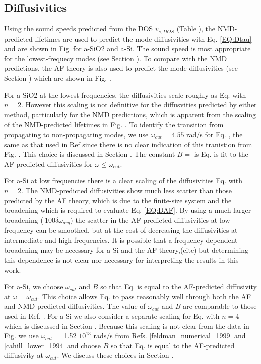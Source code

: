 \documentclass[aps,prb,twocolumn,superscriptaddress,footinbib,amsmath,amssymb,floatfix]{revtex4}
\begin{document}
\subsection{\label{S:Diffusivities}Diffusivities}

Using the sound speeds predicted 
from the DOS $v_{s,DOS}$ (Table ), the NMD-predicted lifetimes are 
used to predict the mode diffusivities with Eq. \eqref{EQ:Dtau} 
and are shown in Fig. for a-SiO2 and a-Si. 
The sound speed is most appropriate  
for the lowest-frequecy modes (see Section ). To compare with the 
NMD predictions, the AF theory is also used to predict the mode 
diffusivities (see Section ) which are shown in Fig. . 

For a-SiO2 at the lowest frequencies, the 
diffusivities scale roughly as Eq. with $n=2$.  However this 
scaling is not definitive for the diffusvities predicted by either 
method, particularly for the NMD predictions, which 
is apparent from the scaling of the NMD-predicted lifetimes 
in Fig. . To identify the transition from propagating 
to non-propagating modes, we use $\omega_{cut} = 4.55$ rad$/$s 
for Eq. , 
the same as that used in Ref  since 
there is no clear indication of this tranistion from Fig. . 
This choice is discussed in Section . The constant 
$B=$ is Eq. 
is fit to the AF-predicted diffusivities for 
$\omega \le \omega_{cut}$.

For a-Si at low frequencies there is a clear scaling of the 
diffusivities Eq. with $n=2$.  
The NMD-predicted diffusivities show much less 
scatter than those predicted by the AF theory, which is due to 
the finite-size system and the broadening which is required to evaluate 
Eq. \eqref{EQ:DAF}.\cite{feldman_thermal_1993} By using a much larger 
broadening ($~100\delta\omega_{avg}$) the scatter in the AF-predicted 
diffusivities at low frequency can be smoothed, but at the cost of 
decreasing the diffusivities at intermediate and high frequencies. 
It is possible that a frequency-dependent broadening may be necessary 
for a-Si and the AF theory,(cite)  
but determining this dependence is not clear nor necessary for 
interpreting the results in this work.  

For a-Si, we choose $\omega_{cut}$ and $B$ so that Eq. is equal 
to the AF-predicted diffusivity at $\omega=\omega_{cut}$. This choice 
allows Eq. to pass reasonably well through both the AF and NMD-predicted 
diffusivities.  The value of $\omega_{cut}$ and $B$ are comparable to 
those used in Ref. .  For a-Si we also consider a separate scaling 
for Eq. with $n=4$ which is discussed in Section . Because this 
scaling is not clear from the data in Fig. we use 
$\omega_{cut} = $ 1.52 $10^13$ rads$/$s  
from Refs. \ref{feldman_numerical_1999} and \ref{cahill_lower_1994} 
and choose $B$ so that Eq. is equal to the AF-predicted 
diffusivity at $\omega_{cut}$. We discuss these choices in Section . 
\end{document}
